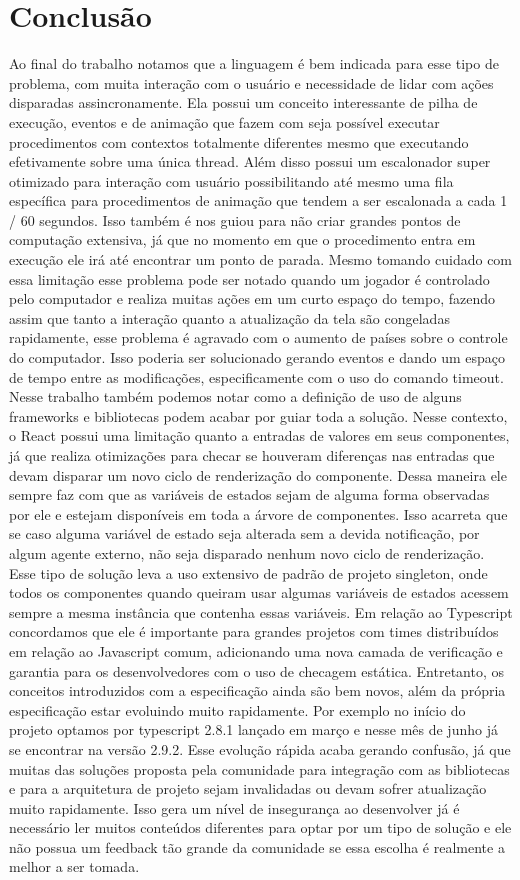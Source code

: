 \documentclass[rel_mlp]{iiufrgs}
\begin{document}
\chapter{Conclusão}
Ao final do trabalho notamos que a linguagem é bem indicada para esse tipo de problema, com muita interação com o usuário e necessidade de lidar com ações disparadas assincronamente.
Ela possui um conceito interessante de pilha de execução, eventos e de animação que fazem com seja possível executar procedimentos com contextos totalmente diferentes mesmo que executando efetivamente sobre uma única thread.
Além disso possui um escalonador super otimizado para interação com usuário possibilitando até mesmo uma fila específica para procedimentos de animação que tendem a ser escalonada a cada 1 / 60 segundos.
Isso também é nos guiou para não criar grandes pontos de computação extensiva, já que no momento em que o procedimento entra em execução ele irá até encontrar um ponto de parada.
Mesmo tomando cuidado com essa limitação esse problema pode ser notado quando um jogador é controlado pelo computador e realiza muitas ações em um curto espaço do tempo, fazendo assim que tanto a interação quanto a atualização da tela são congeladas rapidamente,
esse problema é agravado com o aumento de países sobre o controle do computador. Isso poderia ser solucionado gerando eventos e dando um espaço de tempo entre as modificações, especificamente com o uso do comando timeout.
Nesse trabalho também podemos notar como a definição de uso de alguns frameworks e bibliotecas podem acabar por guiar toda a solução.
Nesse contexto, o React possui uma limitação quanto a entradas de valores em seus componentes, já que realiza otimizações para checar se houveram diferenças nas entradas que devam disparar um novo ciclo de renderização do componente.
Dessa maneira ele sempre faz com que as variáveis de estados sejam de alguma forma observadas por ele e estejam disponíveis em toda a árvore de componentes. Isso acarreta que se caso alguma variável de estado seja alterada sem a devida notificação, por algum agente externo, não seja disparado nenhum novo ciclo de renderização.
Esse tipo de solução leva a uso extensivo de padrão de projeto singleton, onde todos os componentes quando queiram usar algumas variáveis de estados acessem sempre a mesma instância que contenha essas variáveis.
Em relação ao Typescript concordamos que ele é importante para grandes projetos com times distribuídos em relação ao Javascript comum, adicionando  uma nova camada de verificação e garantia para os desenvolvedores com o uso de checagem estática. Entretanto, os conceitos introduzidos com a especificação ainda são bem novos, além da própria especificação estar evoluindo muito rapidamente. Por exemplo no início do projeto optamos por typescript 2.8.1 lançado em março e nesse mês de junho já se encontrar na versão 2.9.2. Esse evolução rápida acaba gerando confusão, já que muitas das soluções proposta pela comunidade para integração com as bibliotecas e para a arquitetura de projeto sejam invalidadas ou devam sofrer atualização muito rapidamente. Isso gera um nível de insegurança ao desenvolver já é necessário ler muitos conteúdos diferentes para optar por um tipo de solução e ele não possua um feedback tão grande da comunidade se essa escolha é realmente a melhor a ser tomada.
\end{document}
